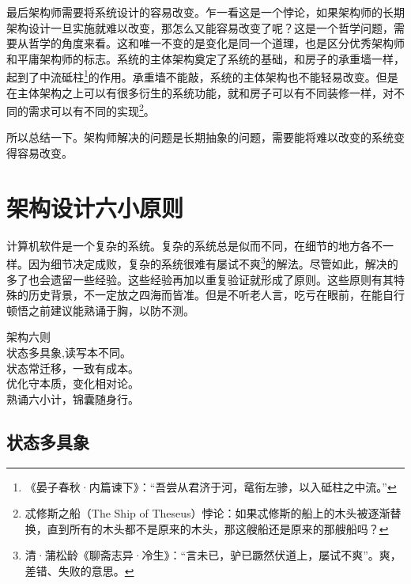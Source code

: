 最后架构师需要将系统设计的容易改变。乍一看这是一个悖论，如果架构师的长期架构设计一旦实施就难以改变，那怎么又能容易改变了呢？这是一个哲学问题，需要从哲学的角度来看。这和唯一不变的是变化是同一个道理，也是区分优秀架构师和平庸架构师的标志。系统的主体架构奠定了系统的基础，和房子的承重墙一样，起到了中流砥柱\footnote{《晏子春秋·内篇谏下》：“吾尝从君济于河，鼋衔左骖，以入砥柱之中流。”}的作用。承重墙不能敲，系统的主体架构也不能轻易改变。但是在主体架构之上可以有很多衍生的系统功能，就和房子可以有不同装修一样，对不同的需求可以有不同的实现\footnote{忒修斯之船（The Ship of Theseus）悖论：如果忒修斯的船上的木头被逐渐替换，直到所有的木头都不是原来的木头，那这艘船还是原来的那艘船吗？}。


所以总结一下。架构师解决的问题是长期抽象的问题，需要能将难以改变的系统变得容易改变。


\section{架构设计六小原则}

计算机软件是一个复杂的系统。复杂的系统总是似而不同，在细节的地方各不一样。因为细节决定成败，复杂的系统很难有屡试不爽\footnote{清·蒲松龄《聊斋志异·冷生》：“言未已，驴已蹶然伏道上，屡试不爽”。爽，差错、失败的意思。}的解法。尽管如此，解决的多了也会遗留一些经验。这些经验再加以重复验证就形成了原则。这些原则有其特殊的历史背景，不一定放之四海而皆准。但是不听老人言，吃亏在眼前，在能自行顿悟之前建议能熟诵于胸，以防不测。

\begin{center}
    \begin{pinyinscope}
    架构六则\\
    状态多具象,读写本不同。\\
    状态常迁移，一致有成本。\\
    优化守本质，变化相对论。\\
    熟诵六小计，锦囊随身行。\\
    \end{pinyinscope}
\end{center}



\subsection{状态多具象}\label{statehasmultipleview}

